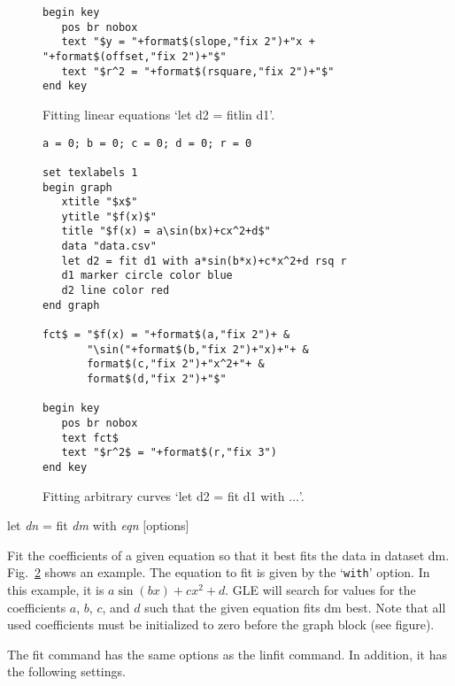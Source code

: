 \begin{commanddescription}
\begin{figure}[tb]
\begin{minipage}[c]{9.2cm}
\begin{Verbatim}
begin key
   pos br nobox
   text "$y = "+format$(slope,"fix 2")+"x + "+format$(offset,"fix 2")+"$"
   text "$r^2 = "+format$(rsquare,"fix 2")+"$"
end key
\end{Verbatim}
\end{minipage}
\hfill
\begin{minipage}[c]{7cm}
\mbox{}
\end{minipage}
\caption{\label{fig:fitlin}Fitting linear equations `let d2 = fitlin d1'.}
\end{figure}

\begin{figure}[tb]
\begin{minipage}[c]{8cm}
\begin{Verbatim}
a = 0; b = 0; c = 0; d = 0; r = 0

set texlabels 1
begin graph
   xtitle "$x$"
   ytitle "$f(x)$"
   title "$f(x) = a\sin(bx)+cx^2+d$"
   data "data.csv"
   let d2 = fit d1 with a*sin(b*x)+c*x^2+d rsq r
   d1 marker circle color blue
   d2 line color red
end graph

fct$ = "$f(x) = "+format$(a,"fix 2")+ &
       "\sin("+format$(b,"fix 2")+"x)+"+ &
       format$(c,"fix 2")+"x^2+"+ &
       format$(d,"fix 2")+"$"

begin key
   pos br nobox
   text fct$
   text "$r^2$ = "+format$(r,"fix 3")
end key
\end{Verbatim}
\end{minipage}
\hfill
\begin{minipage}[c]{7cm}
\mbox{}
\end{minipage}
\caption{\label{fig:fitfct}Fitting arbitrary curves `let d2 = fit d1 with $\ldots$'.}
\end{figure}

\item[{\sf let {\it dn} = fit {\it dm} with {\it eqn} [options]}]

Fit the coefficients of a given equation so that it best fits the data in dataset dm. Fig.~\ref{fig:fitfct} shows an example. The equation to fit is given by the `\texttt{with}' option. In this example, it is $a\sin(bx)+cx^2+d$. GLE will search for values for the coefficients $a$, $b$, $c$, and $d$ such that the given equation fits dm best. Note that all used coefficients must be initialized to zero before the graph block (see figure).

The fit command has the same options as the linfit command. In addition, it has the following settings.


\end{commanddescription}
